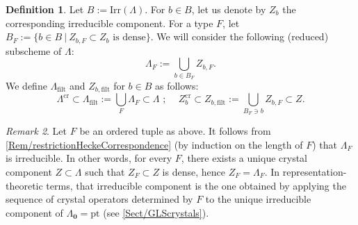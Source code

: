 \documentclass[a4paper,12pt]{article}
\theoremstyle{definition}
\newtheorem{definition}{Definition}[section]
\theoremstyle{plain}
\theoremstyle{remark}
\newtheorem{remark}[definition]{Remark}
\begin{document}
\begin{definition}\label{def/typeCrystalComponent}
Let $B:=\mathrm{Irr}(\Lambda)$. For $b\in B$, let us denote by $Z_b$ the corresponding irreducible component.
For a type $F$, let $B_F:=\{b\in B\ \vert\ Z_{b,F}\subset Z_b\text{ is dense}\}$. We will consider the following (reduced) subscheme of $\Lambda$:
\[
\Lambda_F:=\bigcup_{b\in B_F}Z_{b,F}.
\]
We define $\Lambda_{\mathrm{filt}}$  and $Z_{b,\mathrm{filt}}$ for $b \in B$ as follows:
\begin{equation}\label{eqn stratification of Lambda filt}
\Lambda^{\mathrm{cr}}
\subset
\Lambda_{\mathrm{filt}}:=\bigcup_F\Lambda_F
\subset
\Lambda
\text{ ; } \quad 
Z_b^{\mathrm{cr}}\subset Z_{b,\mathrm{filt}}:=\bigcup_{B_F\ni b}Z_{b,F}\subset Z .
\end{equation}
\end{definition}

\begin{remark}
Let $F$ be an ordered tuple as above. It follows from \cref{Rem/restrictionHeckeCorrespondence} (by induction on the length of $F$) that $\Lambda_F$ is irreducible. In other words, for every $F$, there exists a unique crystal component $Z\subset\Lambda$ such that $Z_F\subset Z$ is dense, hence $Z_F=\Lambda_F$. In representation-theoretic terms, that irreducible component is the one obtained by applying the sequence of crystal operators determined by $F$ to the unique irreducible component of $\Lambda_{\mathbf{0}}=\mathrm{pt}$ (see \cref{Sect/GLScrystals}).
\end{remark}
\end{document}
